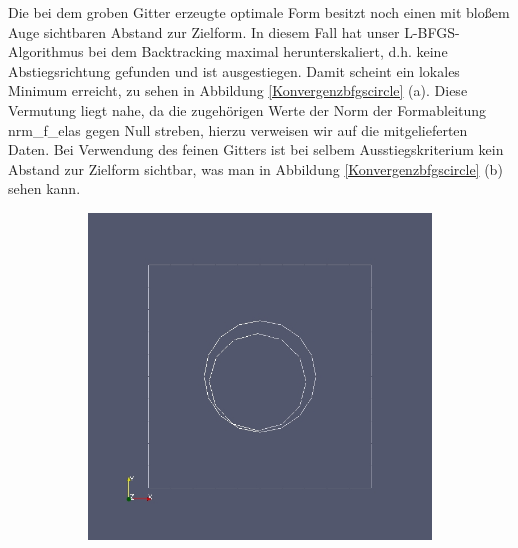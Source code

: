 Die bei dem groben Gitter erzeugte optimale Form besitzt noch einen mit bloßem Auge sichtbaren Abstand zur Zielform. In diesem Fall hat unser L-BFGS-Algorithmus bei dem Backtracking maximal herunterskaliert, d.h. keine Abstiegsrichtung gefunden und ist ausgestiegen. Damit scheint ein lokales Minimum erreicht, zu sehen in Abbildung  \ref{Konvergenzbfgscircle} (a). Diese Vermutung liegt nahe, da die zugehörigen Werte der Norm der Formableitung \textsf{nrm\_f\_elas} gegen Null streben, hierzu verweisen wir auf die mitgelieferten Daten. Bei Verwendung des feinen Gitters ist bei selbem Ausstiegskriterium kein Abstand zur Zielform sichtbar, was man in Abbildung \ref{Konvergenzbfgscircle} (b) sehen kann.

\begin{figure}
	\begin{subfigure}{0.5\textwidth}
	\centering
	\includegraphics[scale=0.25]{pic_bigcircle_bfgs_linesearch.jpg}
	\caption{}	
	\end{subfigure}
	\begin{subfigure}{0.5\textwidth}
	\centering

\end{subfigure}
\end{figure}
